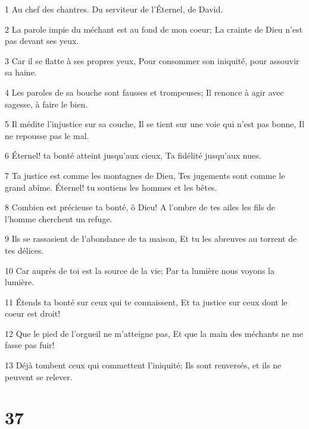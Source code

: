 \par 1 Au chef des chantres. Du serviteur de l'Éternel, de David.
\par 2 La parole impie du méchant est au fond de mon coeur; La crainte de Dieu n'est pas devant ses yeux.
\par 3 Car il se flatte à ses propres yeux, Pour consommer son iniquité, pour assouvir sa haine.
\par 4 Les paroles de sa bouche sont fausses et trompeuses; Il renonce à agir avec sagesse, à faire le bien.
\par 5 Il médite l'injustice sur sa couche, Il se tient sur une voie qui n'est pas bonne, Il ne repousse pas le mal.
\par 6 Éternel! ta bonté atteint jusqu'aux cieux, Ta fidélité jusqu'aux nues.
\par 7 Ta justice est comme les montagnes de Dieu, Tes jugements sont comme le grand abîme. Éternel! tu soutiens les hommes et les bêtes.
\par 8 Combien est précieuse ta bonté, ô Dieu! A l'ombre de tes ailes les fils de l'homme cherchent un refuge.
\par 9 Ils se rassasient de l'abondance de ta maison, Et tu les abreuves au torrent de tes délices.
\par 10 Car auprès de toi est la source de la vie; Par ta lumière nous voyons la lumière.
\par 11 Étends ta bonté sur ceux qui te connaissent, Et ta justice sur ceux dont le coeur est droit!
\par 12 Que le pied de l'orgueil ne m'atteigne pas, Et que la main des méchants ne me fasse pas fuir!
\par 13 Déjà tombent ceux qui commettent l'iniquité; Ils sont renversés, et ils ne peuvent se relever.

\chapter{37}

